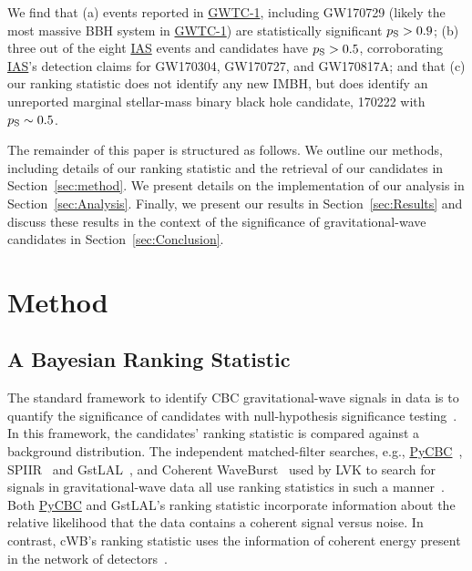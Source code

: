 \documentclass[
 nofootinbib,
 amsmath,amssymb,
 aps,
 twocolumn,
 superscriptaddress
]{revtex4-2}
\newcommand{\gstlal}{{\sc GstLAL}\xspace}
\newcommand{\cwb}{{\sc cWB}\xspace}
\newcommand{\spiir}{{\sc SPIIR}\xspace}
\newcommand{\pycbc}{{\sc \href{https://pycbc.org/}{{PyCBC}}}\xspace}
\newcommand{\GWTC}{{\sc \href{https://ui.adsabs.harvard.edu/abs/2019PhRvX...9c1040A/abstract}{{GWTC-1}}}\xspace}
\newcommand{\IAS}{{\sc \href{https://ui.adsabs.harvard.edu/abs/2020PhRvD.101h3030V/abstract}{{IAS}}}\xspace}
\newcommand{\fancytext}[1]{{\relax\ifmmode#1\else $#1$\fi}\xspace}
\newcommand{\pastrobcr}{\fancytext{p_\text{S}}}
\begin{document}
We find that (a) events reported in \GWTC, including GW170729 (likely the most massive BBH system in \GWTC) are statistically significant $\pastrobcr>0.9$; (b) three out of the eight \IAS events and candidates have $\pastrobcr>0.5$, corroborating \IAS's detection claims for GW170304, GW170727, and GW170817A; and that (c) our ranking statistic does not identify any new IMBH, but does identify an unreported marginal stellar-mass binary black hole candidate, 170222 with $\pastrobcr\sim0.5$. 

The remainder of this paper is structured as follows. We outline our methods, including details of our ranking statistic and the retrieval of our candidates in Section~\ref{sec:method}. We present details on the implementation of our analysis in Section~\ref{sec:Analysis}. Finally, we present our results in Section~\ref{sec:Results} and discuss these results in the context of the significance of gravitational-wave candidates in Section~\ref{sec:Conclusion}.

\section{Method\label{sec:method}}
\subsection{A Bayesian Ranking Statistic}
The standard framework to identify CBC gravitational-wave signals in data is to quantify the significance of candidates with null-hypothesis significance testing~\cite{GWTC1, GWTC2}. In this framework, the candidates' ranking statistic is compared against a background distribution. The independent matched-filter searches, e.g., \pycbc~\cite{pycbc_og4}, \spiir~\cite{spiir} and \gstlal~\cite{sachdev2019gstlal}, and Coherent WaveBurst~\cite{cwb} used by LVK to search for signals in gravitational-wave data all use ranking statistics in such a manner~\cite{GWTC1}. Both \pycbc and \gstlal's ranking statistic incorporate information about the relative likelihood that the data contains a coherent signal versus noise. In contrast, \cwb's ranking statistic uses the information of coherent energy present in the network of detectors~\cite{GWTC1}. 
\end{document}
